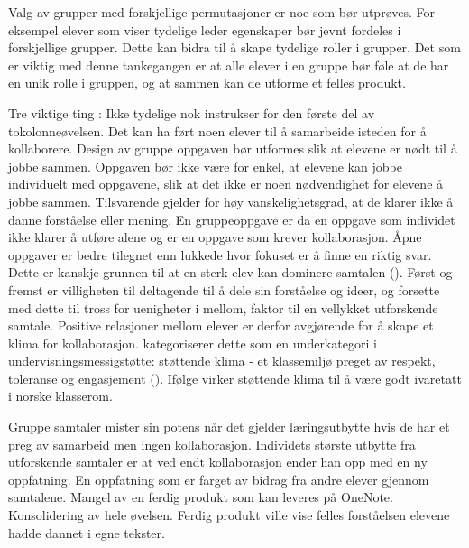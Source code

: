 \documentclass[main.tex]{subfiles}
\begin{document}
Valg av grupper med forskjellige permutasjoner er noe som bør utprøves. For eksempel elever
som viser tydelige leder egenskaper bør jevnt fordeles i forskjellige grupper. Dette kan bidra til
å skape tydelige roller i grupper. Det som er viktig med denne tankegangen er at alle elever
i en gruppe bør føle at de har en unik rolle i gruppen, og at sammen kan de utforme et felles
produkt.

Tre viktige ting : Ikke tydelige nok instrukser for den første del av tokolonneøvelsen. 
Det kan ha ført noen elever til å samarbeide isteden for å kollaborere. Design av 
gruppe oppgaven bør utformes slik at elevene er nødt til å jobbe sammen. Oppgaven
bør ikke være for enkel, at elevene kan jobbe individuelt med oppgavene, slik at
det ikke er noen nødvendighet for elevene å jobbe sammen. Tilsvarende gjelder for høy
vanskelighetsgrad, at de klarer ikke å danne forståelse eller mening. En gruppeoppgave
er da en oppgave som individet ikke klarer å utføre alene og er en oppgave som krever
kollaborasjon.  Åpne oppgaver er bedre tilegnet enn lukkede hvor fokuset er å finne 
en riktig svar. Dette er kanskje grunnen til at en sterk elev kan dominere samtalen 
(). Først og fremst er villigheten til deltagende til å dele
sin forståelse og ideer, og forsette med dette til tross for uenigheter i mellom,
faktor til en vellykket utforskende samtale. Positive relasjoner mellom elever
er derfor avgjørende for å skape et klima for kollaborasjon. 
kategoriserer dette som en underkategori i undervisningsmessigstøtte: støttende
klima - et klassemiljø preget av respekt, toleranse og engasjement (). 
Ifølge  virker støttende klima til å være godt 
ivaretatt i norske klasserom.

Gruppe samtaler mister sin potens når det gjelder 
læringsutbytte hvis de har et preg av samarbeid men ingen kollaborasjon. 
Individets største utbytte fra utforskende samtaler er at ved endt kollaborasjon ender 
han opp med en ny oppfatning. En oppfatning som er farget av bidrag fra andre elever 
gjennom samtalene. Mangel av en ferdig produkt som kan leveres på OneNote. Konsolidering av 
hele øvelsen. Ferdig produkt ville vise felles forståelsen elevene hadde dannet i egne
tekster.
\end{document}
